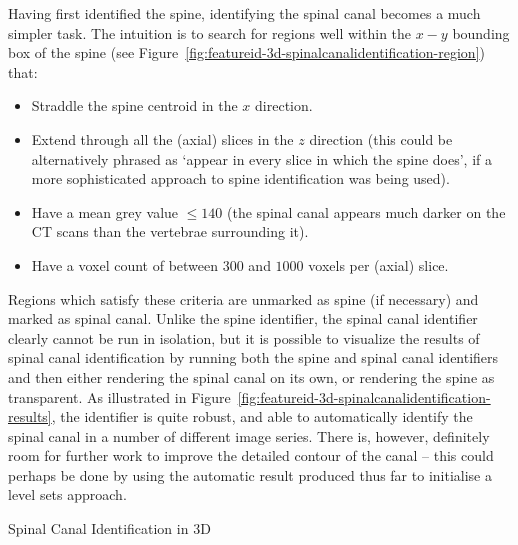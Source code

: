 \noindent Having first identified the spine, identifying the spinal canal becomes a much simpler task. The intuition is to search for regions well within the $x-y$ bounding box of the spine (see Figure~\ref{fig:featureid-3d-spinalcanalidentification-region}) that:
%
\begin{itemize}

\item Straddle the spine centroid in the $x$ direction.
\item Extend through all the (axial) slices in the $z$ direction (this could be alternatively phrased as `appear in every slice in which the spine does', if a more sophisticated approach to spine identification was being used).
\item Have a mean grey value $\le 140$ (the spinal canal appears much darker on the CT scans than the vertebrae surrounding it).
\item Have a voxel count of between $300$ and $1000$ voxels per (axial) slice.

\end{itemize}
%
Regions which satisfy these criteria are unmarked as spine (if necessary) and marked as spinal canal. Unlike the spine identifier, the spinal canal identifier clearly cannot be run in isolation, but it is possible to visualize the results of spinal canal identification by running both the spine and spinal canal identifiers and then either rendering the spinal canal on its own, or rendering the spine as transparent. As illustrated in Figure~\ref{fig:featureid-3d-spinalcanalidentification-results}, the identifier is quite robust, and able to automatically identify the spinal canal in a number of different image series. There is, however, definitely room for further work to improve the detailed contour of the canal -- this could perhaps be done by using the automatic result produced thus far to initialise a level sets approach.

\begin{stulisting}[!b]
\caption{Spinal Canal Identification in 3D}
\label{code:featureid-3d-spinalcanalidentification}

\end{stulisting}

